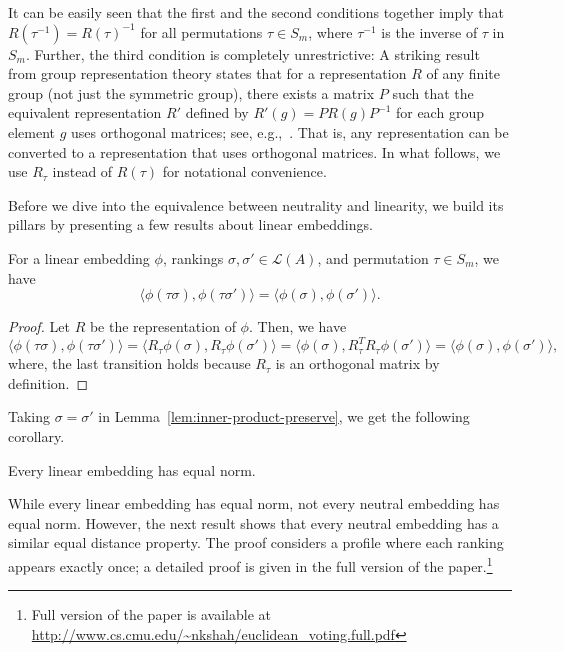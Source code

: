 \documentclass[prodmode]{acmsmall-ec14}
\newcommand{\calL}{{\mathcal{L}}}
\newcommand{\rank}{{\calL(A)}}
\begin{document}
\noindent
It can be easily seen that the first and the second conditions together imply that $R(\tau^{-1}) = R(\tau)^{-1}$ for all permutations $\tau \in S_m$, where $\tau^{-1}$ is the inverse of $\tau$ in $S_m$. Further, the third condition is completely unrestrictive: A striking result from group representation theory states that for a representation $R$ of any finite group (not just the symmetric group), there exists a matrix $P$ such that the equivalent representation $R'$ defined by $R'(g) = P R(g) P^{-1}$ for each group element $g$ uses orthogonal matrices; see, e.g.,~\cite[Thm~6.3]{BMWM63}. That is, any representation can be converted to a representation that uses orthogonal matrices. In what follows, we use $R_{\tau}$ instead of $R(\tau)$ for notational convenience. 

Before we dive into the equivalence between neutrality and linearity, we build its pillars by presenting a few results about linear embeddings. 
\begin{lemma}
For a linear embedding $\phi$, rankings $\sigma,\sigma' \in \rank$, and permutation $\tau \in S_m$, we have
$$
\langle \phi(\tau \sigma), \phi(\tau \sigma') \rangle = \langle \phi(\sigma), \phi(\sigma') \rangle.
$$
\label{lem:inner-product-preserve}
\end{lemma}
\begin{proof}
Let $R$ be the representation of $\phi$. Then, we have 
\begin{equation}
\langle \phi(\tau \sigma), \phi(\tau \sigma') \rangle = \langle R_{\tau}\phi(\sigma), R_{\tau}\phi(\sigma') \rangle = \langle \phi(\sigma), R_{\tau}^T R_{\tau}\phi(\sigma') \rangle = \langle \phi(\sigma), \phi(\sigma') \rangle,
\label{eqn:linear-inner-product}
\end{equation}
where, the last transition holds because $R_{\tau}$ is an orthogonal matrix by definition. 
\end{proof}
%
Taking $\sigma = \sigma'$ in Lemma~\ref{lem:inner-product-preserve}, we get the following corollary.
%
\begin{corollary}
Every linear embedding has equal norm.
\label{cor:linear-equal-norm}
\end{corollary}
%
While every linear embedding has equal norm, not every neutral embedding has equal norm. However, the next result shows that every neutral embedding has a similar equal distance property. The proof considers a profile where each ranking appears exactly once; a detailed proof is given in the full version of the paper.\footnote{Full version of the paper is available at \url{http://www.cs.cmu.edu/~nkshah/euclidean_voting.full.pdf}}
\end{document}
